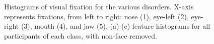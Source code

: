 \documentclass{llncs}
\begin{document}
  \begin{figure}[h]
    \hfill
    \hfill
    \caption{Histograms of visual fixation for the various disorders. X-axis represents fixations, from left to right: nose (1), eye-left (2), eye-right (3), mouth (4), and jaw (5). (a)-(c) feature histograms for all participants of each class, with non-face removed.}
    \label{fig:histo}
    \vspace{-2ex}
  \end{figure}

  
\end{document}
